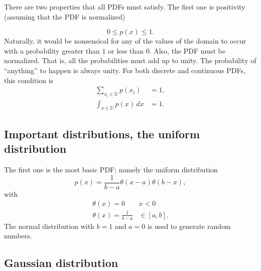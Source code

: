 \documentclass[%
oneside,                 %
final,                   %
10pt]{article}
\newenvironment{block_mdfboxadmon}[1][]{
\begin{block_mdfboxmdframed}[frametitle=#1]
}
{
\end{block_mdfboxmdframed}
}
\begin{document}
\begin{block_mdfboxadmon}[]

There are two properties that all PDFs must satisfy. The first one is
positivity (assuming that the PDF is normalized)

\begin{equation*}
0 \leq p(x) \leq 1.
\end{equation*}
Naturally, it would be nonsensical for any of the values of the domain
to occur with a probability greater than $1$ or less than $0$. Also,
the PDF must be normalized. That is, all the probabilities must add up
to unity.  The probability of ``anything'' to happen is always unity. For
both discrete and continuous PDFs, this condition is
\begin{align*}
\sum_{x_i\in\mathbb D} p(x_i) & =  1,\\
\int_{x\in\mathbb D} p(x)\,dx & =  1.
\end{align*}
\end{block_mdfboxadmon} %



\subsection{Important distributions, the uniform distribution}

\begin{block_mdfboxadmon}[]
The first one
is the most basic PDF; namely the uniform distribution
\begin{equation}
p(x) = \frac{1}{b-a}\theta(x-a)\theta(b-x),
\label{eq:unifromPDF}
\end{equation}
with
\begin{equation*}
\begin{array}{ll}
\theta(x)=0 & x<0 \\
\theta(x)=\frac{1}{b-a} & \in [a,b].
\end{array}
\end{equation*}
The normal distribution with $b=1$ and $a=0$ is used to generate random numbers.
\end{block_mdfboxadmon} %



\subsection{Gaussian distribution}
\end{document}
